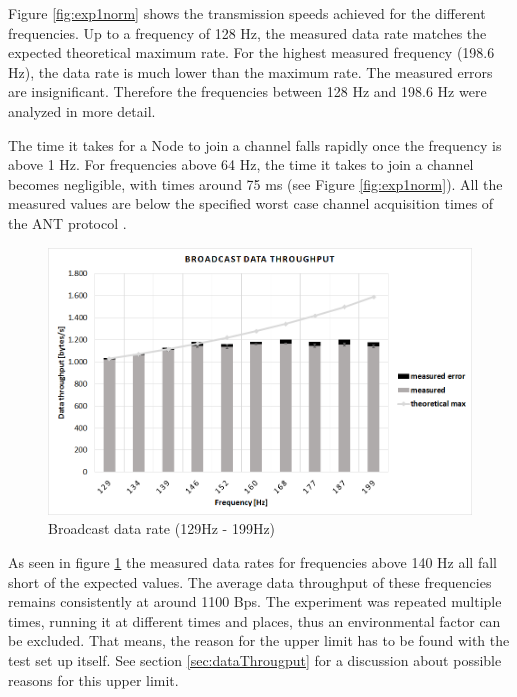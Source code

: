 \begin{description}
	Figure \ref{fig:exp1norm} shows the transmission speeds achieved for the different frequencies. Up to a frequency of 128 Hz, the measured data rate matches the expected theoretical maximum rate. For the highest measured frequency (198.6 Hz), the data rate is much lower than the maximum rate. The measured errors are insignificant. Therefore the frequencies between 128 Hz and 198.6 Hz were analyzed in more detail. 
		
	The time it takes for a Node to join a channel falls rapidly once the frequency is above 1 Hz. For frequencies above 64 Hz, the time it takes to join a channel becomes negligible, with times around 75 ms (see Figure \ref{fig:exp1norm}). All the measured values are below the specified worst case channel acquisition times of the ANT protocol \cite{AntChan}.
	
	\begin{figure}[H]
		\centering
		\includegraphics[scale=0.5]{content/images/exp1_detail.png}
		\caption{Broadcast data rate (129Hz - 199Hz)}\label{fig:exp1between}
	\end{figure}
	As seen in figure \ref{fig:exp1between} the measured data rates for frequencies above 140 Hz all fall short of the expected values. The average data throughput of these frequencies remains consistently at around 1100 Bps. The experiment was repeated multiple times, running it at different times and places, thus an environmental factor can be excluded. That means, the reason for the upper limit has to be found with the test set up itself. See section \ref{sec:dataThrougput} for a discussion about possible reasons for this upper limit.
	

\end{description}
